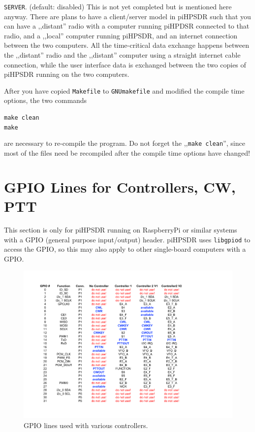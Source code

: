 \documentclass[12pt]{book}
\def\rett#1{\texttt{\color{red}#1}}
\def\grtt#1{\texttt{\color{magenta}#1}}
\begin{document}
 \rett{SERVER}. (default: disabled)
 This is not yet completed but is mentioned here anyway. There are plans to have
 a client/server model in piHPSDR such that you can have a ,,distant'' radio with a computer
 running piHPDSR connected to that radio, and a ,,local'' computer running piHPSDR, and an
 internet connection between the two computers. All the time-critical data exchange happens
 between the ,,distant'' radio and the ,,distant'' computer using a straight internet
 cable connection, while the user interface data is exchanged between the two copies of
 piHPSDR running on the two computers.
 
 After you have copied \texttt{Makefile} to \texttt{GNUmakefile} and modified the compile time
 options, the two commands
 
\grtt{make clean} \\
\grtt{make}

are necessary to re-compile the program. Do not forget the ,,\texttt{make clean}'', since 
most of the files need be recompiled after the compile time options have changed!
\chapter{GPIO Lines for Controllers, CW, PTT}
\label{sec:gpio}
This section is only for piHPSDR running on RaspberryPi or similar systems with a GPIO (general purpose
input/output) header. piHPSDR uses \texttt{libgpiod} to access the GPIO, so this may also apply to
other single-board computers with a GPIO.

\begin{figure}[ht]
\center
\includegraphics[width=15cm]{GPIO.pdf}
\caption{GPIO lines used with various controllers.}
\label{fig:GPIO}
\end{figure}
\end{document}
